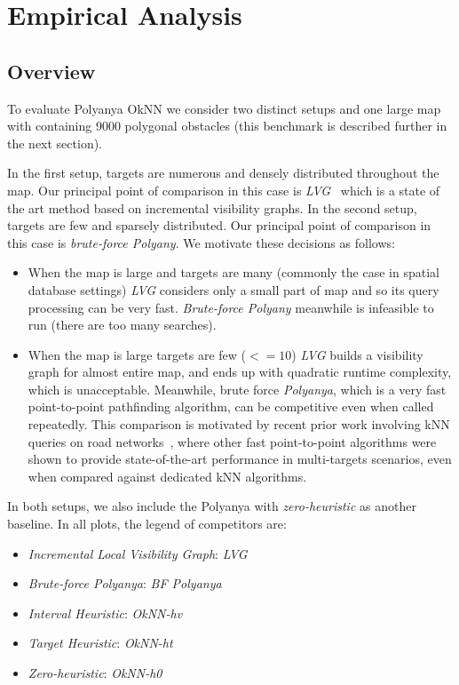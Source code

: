 \chapter{Empirical Analysis}\label{empirical}
\section{Overview}\label{expoverview}
To evaluate Polyanya OkNN we consider two distinct setups and one large map with 
containing 9000 polygonal obstacles (this benchmark is described further in the next section).

In the first setup, targets are numerous and densely distributed throughout
the map. Our principal point of comparison in this case is \textit{LVG}~\cite{zhang2004spatial} which
is a state of the art method based on incremental visibility graphs. 
In the second setup, targets are few and sparsely distributed.
Our principal point of comparison in this case is \textit{brute-force Polyany}.
We motivate these decisions as follows:

\begin{itemize}[leftmargin=1cm]
\item When the map is large and targets are many (commonly the case in spatial database settings) \textit{LVG} considers only a small part of map and so its query processing can be very fast.
  \textit{Brute-force Polyany} meanwhile is infeasible to run (there are too many searches).

\item When the map is large targets are few ($<=10$) \textit{LVG} builds a visibility graph for almost entire map,
  and ends up with quadratic runtime complexity, which is unacceptable.
    Meanwhile, brute force \textit{Polyanya}, which is a very fast point-to-point pathfinding algorithm,
    can be competitive even when called repeatedly.
    This comparison is motivated by recent prior work involving kNN queries on road networks~\cite{abeywickrama2016k},
    where other fast point-to-point algorithms were shown to provide state-of-the-art performance in multi-targets scenarios,
    even when compared against dedicated kNN algorithms.
\end{itemize}
In both setups, we also include the Polyanya with \textit{zero-heuristic} as another baseline.
In all plots, the legend of competitors are:
\begin{itemize}
  \item \textit{Incremental Local Visibility Graph}\cite{zhang2004spatial}: \textit{LVG}
  \item \textit{Brute-force Polyanya}: \textit{BF Polyanya}
  \item \textit{Interval Heuristic}: \textit{OkNN-hv}
  \item \textit{Target Heuristic}: \textit{OkNN-ht}
  \item \textit{Zero-heuristic}: \textit{OkNN-h0}
\end{itemize}

